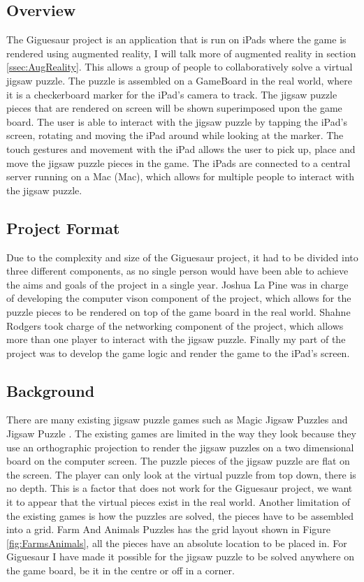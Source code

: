 \documentclass{article}
\begin{document}
\subsection{Overview}
The Giguesaur project is an application that is run on iPads where the game is
rendered using augmented reality, I will talk more of augmented reality in
section \ref{ssec:AugReality}. This allows a group of people to collaboratively
solve a virtual jigsaw puzzle. The puzzle is assembled on a \gls{GameBoard} in
the real world, where it is a checkerboard marker for the iPad's camera to
track. The jigsaw puzzle pieces that are rendered on screen will be shown
superimposed upon the game board. The user is able to interact with the jigsaw
puzzle by tapping the iPad's screen, rotating and moving the iPad around while
looking at the marker. The touch gestures and movement with the iPad allows the
user to pick up, place and move the jigsaw puzzle pieces in the game. The iPads
are connected to a central server running on a \gls{Mac} (Mac), which allows for
multiple people to interact with the jigsaw puzzle.

\subsection{Project Format}
Due to the complexity and size of the Giguesaur project, it had to be divided
into three different components, as no single person would have been able to
achieve the aims and goals of the project in a single year. Joshua La Pine was
in charge of developing the computer vison component of the project, which
allows for the puzzle pieces to be rendered on top of the game board in the real
world. Shahne Rodgers took charge of the networking component of the project,
which allows more than one player to interact with the jigsaw puzzle. Finally my
part of the project was to develop the game logic and render the game to the
iPad's screen.

\subsection{Background}
There are many existing jigsaw puzzle games such as Magic Jigsaw Puzzles
\cite{ref:MagicJigsaw} and Jigsaw Puzzle \cite{ref:JigsawPuzzle}. The existing
games are limited in the way they look because they use an orthographic
projection to render the jigsaw puzzles on a two dimensional board on the
computer screen. The puzzle pieces of the jigsaw puzzle are flat on the
screen. The player can only look at the virtual puzzle from top down, there is
no depth. This is a factor that does not work for the Giguesaur project, we want
it to appear that the virtual pieces exist in the real world. Another limitation
of the existing games is how the puzzles are solved, the pieces have to be
assembled into a grid. Farm And Animals Puzzles \cite{ref:FarmPuzzle} has the
grid layout shown in Figure \ref{fig:FarmsAnimals}, all the pieces have an
absolute location to be placed in. For Giguesaur I have made it possible for the
jigsaw puzzle to be solved anywhere on the game board, be it in the centre or
off in a corner.
\end{document}
